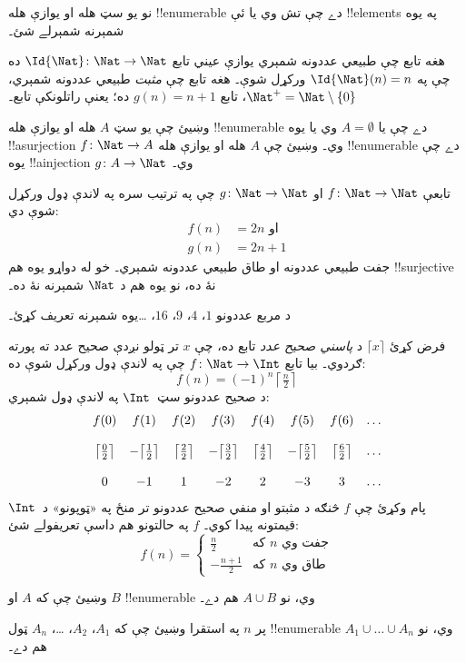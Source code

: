 \documentclass[../../../include/open-logic-section]{subfiles}
\begin{document}
\begin{explain}
نو يو سټ هله او يوازې هله !!{enumerable} دے چې تش وي يا ئې
!!{element}s په يوه شمېرنه شمېرلے شئ۔
\end{explain}

\begin{ex}
هغه تابع چې طبيعي عددونه شمېري يوازې عيني تابع
$\Id{\Nat} \colon \Nat \to \Nat$ ده چې په
$\Id{\Nat}(n) = n$ ورکړل شوې۔ هغه تابع چې \emph{مثبت} طبيعي
عددونه شمېري، $\Nat^+ = \Nat \setminus \{0\}$، تابع
$g(n) = n + 1$ ده؛ يعنې راتلونکې تابع۔
\end{ex}

\begin{prob}
وښيئ چې يو سټ $A$ هله او يوازې هله !!{enumerable} دے چې يا
$A = \emptyset$ وي يا يوه !!a{surjection} $f\colon \Nat \to A$
وي۔ وښيئ چې $A$ هله او يوازې هله !!{enumerable} دے چې يوه
!!a{injection} $g\colon A \to \Nat$ وي۔
\end{prob}

\begin{ex}
تابعې $f\colon \Nat \to \Nat$ او $g \colon \Nat \to \Nat$ چې
په ترتيب سره په لاندې ډول ورکړل شوې دي:
\begin{align*}
  f(n) & = 2n \text{ او}\\
  g(n) & = 2n+1
\end{align*}
جفت طبيعي عددونه او طاق طبيعي عددونه شمېري۔ خو له دواړو يوه هم
!!{surjective} نۀ ده، نو يوه هم د $\Nat$ شمېرنه نۀ ده۔
\end{ex}

\begin{prob}
د مربع عددونو $1$، $4$، $9$، $16$، \dots يوه شمېرنه تعريف کړئ۔
\end{prob}

\begin{ex}
فرض کړئ $\lceil x \rceil$ د \emph{پاسني صحيح عدد} تابع ده، چې
$x$ تر ټولو نږدې صحيح عدد ته پورته ګردوي۔ بيا تابع
$f \colon \Nat \to \Int$ چې په لاندې ډول ورکړل شوې ده:
\[
  f(n) = (-1)^{n} \left\lceil\tfrac{n}{2}\right\rceil
\]
د صحيح عددونو سټ~$\Int$ په لاندې ډول شمېري:
\[
\begin{array}{c c c c c c c c}
f(0) & f(1) & f(2) & f(3) & f(4) & f(5) & f(6) & \dots \\ \\
\big\lceil \tfrac{0}{2} \big\rceil & -\big\lceil \tfrac{1}{2}\big\rceil &  \big\lceil \tfrac{2}{2} \big\rceil & -\big\lceil \tfrac{3}{2} \big\rceil & \big\lceil \tfrac{4}{2} \big\rceil  & -\big\lceil \tfrac{5}{2}\big\rceil & \big\lceil \tfrac{6}{2} \big\rceil & \dots \\ \\
0 & -1 & 1 & -2 & 2 & -3 & 3& \dots
\end{array}
\]
پام وکړئ چې $f$ څنګه د مثبتو او منفي صحيح عددونو تر منځ په
«ټوپونو» د~$\Int$ قيمتونه پيدا کوي۔ $f$ په حالتونو هم داسې
تعريفولے شئ:
\[
f(n) = \begin{cases}
  \frac{n}{2} & \text{که $n$ جفت وي}\\
  -\frac{n+1}{2} & \text{که $n$ طاق وي}
  \end{cases}
\]
\end{ex}

\begin{prob}
وښيئ چې که $A$ او $B$ !!{enumerable} وي، نو $A \cup B$ هم دے۔
\end{prob}

\begin{prob}
پر $n$ په استقرا وښيئ چې که $A_1$، $A_2$، \dots، $A_n$ ټول
!!{enumerable} وي، نو $A_1 \cup \dots \cup A_n$ هم دے۔
\end{prob}
\end{document}
